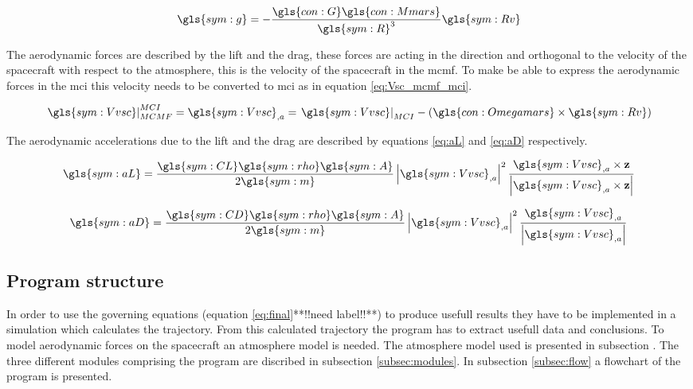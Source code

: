 \begin{equation} \label{eq:nG}
\gls{sym:g} = -\frac{\gls{con:G}\gls{con:Mmars}}
					{\gls{sym:R}^3}\gls{sym:Rv}
\end{equation}

The aerodynamic forces are described by the lift and the drag, these forces are acting in the direction and orthogonal to the velocity of the spacecraft with respect to the atmosphere, this is the velocity of the spacecraft in the \gls{mcmf}. To make be able to express the aerodynamic forces in the \gls{mci} this velocity needs to be converted to \gls{mci} as in equation \ref{eq:Vsc_mcmf_mci}.

\begin{equation} \label{eq:Vsc_mcmf_mci}
\left.\gls{sym:Vvsc}\right|_{MCMF}^{MCI} = \gls{sym:Vvsc}_{,a} = \left.\gls{sym:Vvsc}\right|_{MCI} - \left(\gls{con:Omegamars} \times \gls{sym:Rv} \right)
\end{equation}

The aerodynamic accelerations due to the lift and the drag are described by equations \ref{eq:aL} and \ref{eq:aD} respectively.

\begin{equation} \label{eq:aL}
\gls{sym:aL} = \frac{\gls{sym:CL}\gls{sym:rho}\gls{sym:A}}{2 \gls{sym:m}} 
				\left|\gls{sym:Vvsc}_{,a}\right|^2
				\frac{\gls{sym:Vvsc}_{,a} \times \mathbf{z}}
				{\left| \gls{sym:Vvsc}_{,a} \times \mathbf{z}\right|}
\end{equation}

\begin{equation} \label{eq:aD}
\gls{sym:aD} = \frac{\gls{sym:CD}\gls{sym:rho}\gls{sym:A}}{2 \gls{sym:m}}
				\left|\gls{sym:Vvsc}_{,a}\right|^2 \frac{\gls{sym:Vvsc}_{,a}}{\left|\gls{sym:Vvsc}_{,a}\right|}
\end{equation}

\subsection{Program structure}\label{sec:prog_struct}

In order to use the governing equations (equation \ref{eq:final}**!!need label!!**) to produce usefull results they have to be implemented in a simulation which calculates the trajectory. From this calculated trajectory the program has to extract usefull data and conclusions. To model aerodynamic forces on the spacecraft an atmosphere model is needed. The atmosphere model used is presented in subsection \label{subsec:atmos}. The three different modules comprising the program are discribed in subsection \ref{subsec:modules}. In subsection \ref{subsec:flow} a flowchart of the program is presented.

